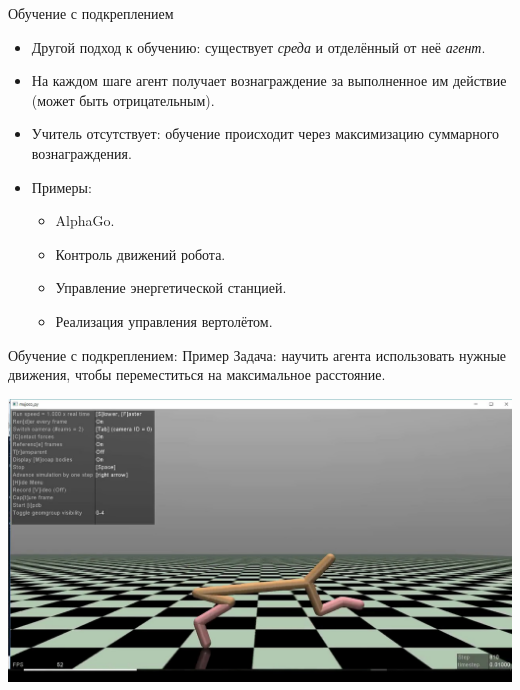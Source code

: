 \documentclass[c, handout]{beamer} %
\begin{document}
\begin{frame}{Обучение с подкреплением}
	
	\begin{itemize}
		\item<1-> Другой подход к обучению: существует \textit{среда} и отделённый от неё \textit{агент}.
		\item<1-> На каждом шаге агент получает вознаграждение за выполненное им действие (может быть отрицательным).
		\item<1-> Учитель отсутствует: обучение происходит через максимизацию суммарного вознаграждения. 
		\item<2-> Примеры:
		\begin{itemize}
			\item AlphaGo.
			\item Контроль движений робота.
			\item Управление энергетической станцией.
			\item Реализация управления вертолётом.
		\end{itemize}
	\end{itemize}
\end{frame}

\begin{frame}{Обучение с подкреплением: Пример}
	Задача: научить агента использовать нужные движения, чтобы переместиться на максимальное расстояние.
	
	\begin{center}
		\href{https://towardsdatascience.com/training-a-cheetah-to-run-with-deep-reinforcement-learning-6dca2975443a?gi=3ca7d8cbbbdd}{\includegraphics[width=0.9\linewidth]{hc.jpg}}
	\end{center}
\end{frame}
\end{document}
